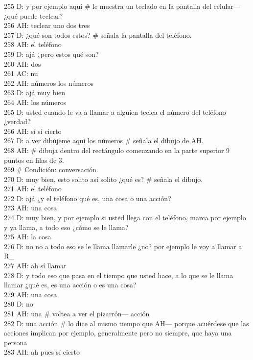 255 D: y por ejemplo aquí \# le muestra un teclado en la pantalla del celular--- ¿qué puede teclear?\\
256 AH: teclear uno dos tres\\
257 D: ¿qué son todos estos? \# señala la pantalla del teléfono.\\
258 AH: el teléfono\\
259 D: ajá ¿pero estos qué son?\\
260 AH: dos\\
261 AC: nu\\
262 AH: números los números\\
263 D: ajá muy bien\\
264 AH: los números\\
265 D: usted cuando le va a llamar a alguien teclea el número del teléfono ¿verdad?\\
266 AH: sí sí cierto\\
267 D: a ver dibújeme aquí los números \# señala el dibujo de AH.\\
268 AH: \# dibuja dentro del rectángulo comenzando en la parte superior 9 puntos en filas de 3.\\
269 \# Condición: conversación.\\
270 D: muy bien, esto solito así solito ¿qué es? \# señala el dibujo.\\
271 AH: el teléfono\\
272 D: ajá ¿y el teléfono qué es, una cosa o una acción?\\
273 AH: una cosa\\
274 D: muy bien, y por ejemplo si usted llega con el teléfono, marca por ejemplo y ya llama, a todo eso ¿cómo se le llama?\\
275 AH: la cosa\\
276 D: no no a todo eso se le llama llamarle ¿no? por ejemplo le voy a llamar a R\_\\
277 AH: ah sí llamar\\
278 D: y todo eso que pasa en el tiempo que usted hace, a lo que se le llama llamar ¿qué es, es una acción o es una cosa?\\
279 AH: una cosa\\
280 D: no\\
281 AH: una \# voltea a ver el pizarrón--- acción\\
282 D: una acción \# lo dice al mismo tiempo que AH--- porque acuérdese que las acciones implican por ejemplo, generalmente pero no siempre, que haya una persona\\
283 AH: ah pues sí cierto\\
